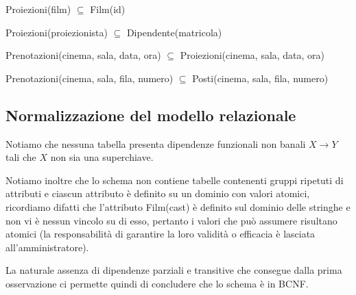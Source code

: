 Proiezioni(film) $\subseteq$ Film(id)

Proiezioni(proiezionista) $\subseteq$ Dipendente(matricola)

Prenotazioni(cinema, sala, data, ora)
$\subseteq$
Proiezioni(cinema, sala, data, ora)

Prenotazioni(cinema, sala, fila, numero)
$\subseteq$
Posti(cinema, sala, fila, numero)

\subsection*{Normalizzazione del modello relazionale}
%
%

Notiamo che nessuna tabella presenta dipendenze funzionali non banali
$X \rightarrow Y$ tali che $X$ non sia una superchiave.

Notiamo inoltre che lo schema non contiene tabelle contenenti gruppi ripetuti
di attributi e ciascun attributo è definito su un dominio con valori atomici,
ricordiamo difatti che l'attributo Film(cast) è definito sul dominio delle
stringhe e non vi è nessun vincolo su di esso, pertanto i valori che può
assumere risultano atomici (la responsabilità di garantire la loro validità o
efficacia è lasciata all'amministratore).

La naturale assenza di dipendenze parziali e transitive che consegue dalla
prima osservazione ci permette quindi di concludere che lo schema è in BCNF.
